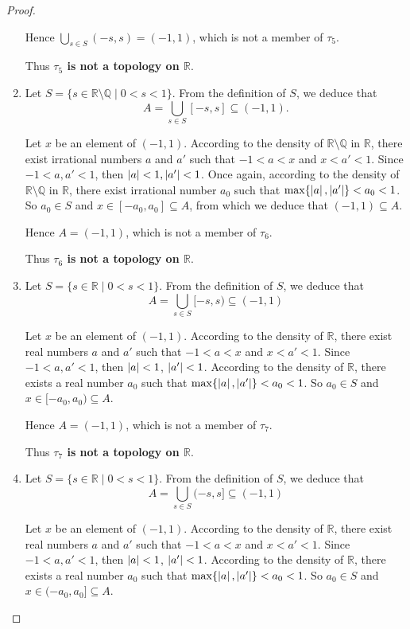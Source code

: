 \begin{proof}
\begin{enumerate}[label={(\roman*)}]
              Hence $\bigcup_{s\in S} (-s, s) = (-1, 1)$, which is not a member of $\tau_{5}$.

              Thus \textbf{$\tau_{5}$ is not a topology on $\mathbb{R}$}.
        \item Let $S = \{ s\in\mathbb{R}\setminus\mathbb{Q} \mid 0 < s < 1 \}$. From the definition of $S$, we deduce that
              \[
                  A = \bigcup_{s\in S} [-s, s]\subseteq (-1, 1).
              \]

              Let $x$ be an element of $(-1, 1)$. According to the density of $\mathbb{R}\setminus\mathbb{Q}$ in $\mathbb{R}$, there exist irrational numbers $a$ and $a'$ such that $-1 < a < x$ and $x < a' < 1$. Since $-1 < a, a' < 1$, then $\left\vert{a}\right\vert < 1, \left\vert{a'}\right\vert < 1$. Once again, according to the density of $\mathbb{R}\setminus\mathbb{Q}$ in $\mathbb{R}$, there exist irrational number $a_{0}$ such that $\max\{ \left\vert{a}\right\vert, \left\vert{a'}\right\vert \} < a_{0} < 1$. So $a_{0}\in S$ and $x\in [-a_{0}, a_{0}]\subseteq A$, from which we deduce that $(-1, 1)\subseteq A$.

              Hence $A = (-1, 1)$, which is not a member of $\tau_{6}$.

              Thus \textbf{$\tau_{6}$ is not a topology on $\mathbb{R}$}.
        \item Let $S = \{ s\in\mathbb{R} \mid 0 < s < 1 \}$. From the definition of $S$, we deduce that
              \[
                  A = \bigcup_{s\in S} [-s, s) \subseteq (-1, 1)
              \]

              Let $x$ be an element of $(-1, 1)$. According to the density of $\mathbb{R}$, there exist real numbers $a$ and $a'$ such that $-1 < a < x$ and $x < a' < 1$. Since $-1 < a, a' < 1$, then $\left\vert{a}\right\vert < 1$, $\left\vert{a'}\right\vert < 1$. According to the density of $\mathbb{R}$, there exists a real number $a_{0}$ such that $\max\{ \left\vert{a}\right\vert, \left\vert{a'}\right\vert \} < a_{0} < 1$. So $a_{0}\in S$ and $x\in [-a_{0}, a_{0})\subseteq A$.

              Hence $A = (-1, 1)$, which is not a member of $\tau_{7}$.

              Thus \textbf{$\tau_{7}$ is not a topology on $\mathbb{R}$}.
        \item Let $S = \{ s\in\mathbb{R} \mid 0 < s < 1 \}$. From the definition of $S$, we deduce that
              \[
                  A = \bigcup_{s\in S} (-s, s] \subseteq (-1, 1)
              \]

              Let $x$ be an element of $(-1, 1)$. According to the density of $\mathbb{R}$, there exist real numbers $a$ and $a'$ such that $-1 < a < x$ and $x < a' < 1$. Since $-1 < a, a' < 1$, then $\left\vert{a}\right\vert < 1$, $\left\vert{a'}\right\vert < 1$. According to the density of $\mathbb{R}$, there exists a real number $a_{0}$ such that $\max\{ \left\vert{a}\right\vert, \left\vert{a'}\right\vert \} < a_{0} < 1$. So $a_{0}\in S$ and $x\in (-a_{0}, a_{0}]\subseteq A$.


\end{enumerate}
\end{proof}
